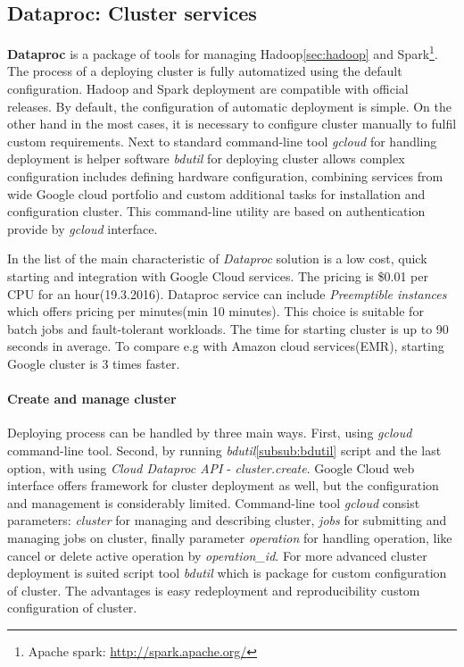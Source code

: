 \documentclass[a4paper,12pt,oneside]{report}
\begin{document}
		\subsection{Dataproc: Cluster services}
		\label{subsub:dataproc}
\textbf{Dataproc} is a package of tools for managing Hadoop\ref{sec:hadoop} 
and Spark\footnote{Apache spark: \url{http://spark.apache.org/}}.
The process of a deploying cluster is fully automatized using the default 
configuration. Hadoop and Spark deployment are compatible with official
releases. By default, the configuration of automatic deployment is simple. 
On the other hand in the most cases, it is 
necessary to configure cluster manually to fulfil custom requirements. 
Next to standard command-line tool \textit{gcloud} for handling deployment is 
helper software \emph{bdutil} for deploying cluster allows complex 
configuration includes 
defining hardware configuration, combining services from wide Google cloud 
portfolio and custom additional tasks for installation and configuration cluster. 
This command-line utility are based on authentication provide by \textit{gcloud} interface.

In the list of the main characteristic of \textit{Dataproc} solution is a 
low cost, quick starting and integration with Google Cloud services. 
The pricing is  \$0.01 per CPU for an hour(19.3.2016). Dataproc service can 
include \textit{Preemptible instances} which offers pricing 
per minutes(min 10 minutes). This choice is suitable for batch jobs and 
fault-tolerant workloads. The time for starting cluster is up to 
90 seconds in average. To compare e.g with Amazon cloud services(EMR)\cite{amazon_emr}, 
starting Google cluster is 3 times faster.

\paragraph{Create and manage cluster} Deploying process can be handled by three main 
ways. First, using \textit{gcloud} command-line tool. Second, by running \textit{bdutil}\ref{subsub:bdutil} 
script and the last option, with using 
\textit{Cloud Dataproc API} - \textit{cluster.create}. Google Cloud web interface offers 
framework for cluster deployment as well, but the configuration and 
management is considerably limited. 
Command-line tool \textit{gcloud} consist parameters: \textit{cluster} for managing and 
describing cluster, \textit{jobs} for submitting 
and managing jobs on cluster, finally parameter \textit{operation} for handling operation, 
like cancel or delete active
 operation by \emph{operation\_id}. For more advanced cluster deployment is suited script 
 tool \textit{bdutil} which is 
 package for custom configuration of cluster. The advantages is easy redeployment and 
 reproducibility custom
  configuration of cluster. 
\end{document}
